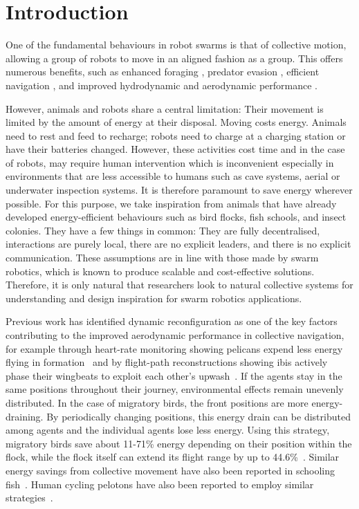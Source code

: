 \documentclass[runningheads]{llncs}
\begin{document}
\section{Introduction}
One of the fundamental behaviours in robot swarms is that of collective motion, allowing a group of robots to move in an aligned fashion as a group\cite{vicsek-col-motion}. This offers numerous benefits, such as enhanced foraging \cite{couzin2005effective}, predator evasion \cite{olson2013predator}, efficient navigation \cite{couzin2005effective}, and improved hydrodynamic and aerodynamic performance \cite{beaver2021overview}.

However, animals and robots share a central limitation: Their movement is limited by the amount of energy at their disposal. Moving costs energy. Animals need to rest and feed to recharge; robots need to charge at a charging station or have their batteries changed. However, these activities cost time and in the case of robots, may require human intervention which is inconvenient especially in environments that are less accessible to humans such as cave systems, aerial or underwater inspection systems. It is therefore paramount to save energy wherever possible. For this purpose, we take inspiration from animals that have already developed energy-efficient behaviours such as bird flocks, fish schools, and insect colonies. They have a few things in common: They are fully decentralised, interactions are purely local, there are no explicit leaders, and there is no explicit communication. These assumptions are in line with those made by swarm robotics, which is known to produce scalable and cost-effective solutions\cite{Brambilla2013,Dorigo2021,Debie2023,FariaDias2021}. Therefore, it is only natural that researchers look to natural collective systems for understanding and design inspiration for swarm robotics applications\cite{Andersson2004,Voelkl2017,Mirzaeinia2020,Hassanalian2022,Beaumont2024,Friman2024}.

Previous work has identified dynamic reconfiguration as one of the key factors contributing to the improved aerodynamic performance in collective navigation\cite{beaver2021overview}, for example through heart-rate monitoring showing pelicans expend less energy flying in formation~\cite{weimerskirch2001} and by flight-path reconstructions showing ibis actively phase their wingbeats to exploit each other's upwash~\cite{portugal2014}. If the agents stay in the same positions throughout their journey, environmental effects remain unevenly distributed. In the case of migratory birds, the front positions are more energy-draining. By periodically changing positions, this energy drain can be distributed among agents and the individual agents lose less energy. Using this strategy, migratory birds save about 11-71\% energy depending on their position within the flock, while the flock itself can extend its flight range by up to 44.6\%~\cite{Voelkl2017,Mirzaeinia2020,Beaumont2024}. Similar energy savings from collective movement have also been reported in schooling fish~\cite{Zhang2024}. Human cycling pelotons have also been reported to employ similar strategies~\cite{Blocken2018}.
\end{document}
